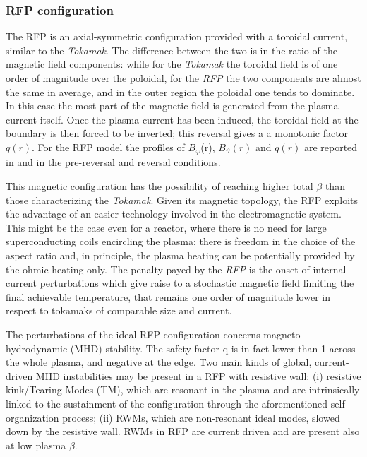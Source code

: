 \subsubsection{RFP configuration}
The \ac{RFP} is an axial-symmetric configuration provided with a toroidal current, similar to the \textit{Tokamak}. The difference between the two is in the ratio of the magnetic field components: while for the \textit{Tokamak} the toroidal field is of one order of magnitude over the poloidal, for the \textit{RFP} the two components are almost the same in average, and in the outer region the poloidal one tends to dominate. In this case the most part of the magnetic field is generated from the plasma current itself.
Once the plasma current has been induced, the toroidal field at the boundary is then forced to be inverted; this reversal gives a  a monotonic factor $q(r)$. For the \acs{RFP} model the profiles of $B_\varphi$(r), $B_\vartheta(r)$ and $q(r)$ are reported in \Figure{\ref{fig:intro_safety_factor_profiles_b}} and \Figure{\ref{fig:intro_safety_factor_profiles_c}} in the pre-reversal and reversal conditions.

This magnetic configuration has the possibility of reaching higher total $\beta$ than those characterizing the \textit{Tokamak}. 
Given its magnetic topology, the RFP exploits the advantage of an easier technology involved in the electromagnetic system. This might be the case even for a reactor, where there is no need for large superconducting coils encircling the plasma; there is freedom in the choice of the aspect ratio and, in principle, the plasma heating can be potentially provided by the ohmic heating only.  
The penalty payed by the \textit{RFP} is the onset of internal current perturbations  which give raise to a stochastic magnetic field limiting the final achievable temperature, that remains one order of magnitude lower in respect to tokamaks of comparable size and current.

The perturbations of the ideal RFP configuration concerns magneto-hydrodynamic (MHD) stability. The safety factor q is in fact lower than 1 across the whole plasma, and negative at the edge. 
Two main kinds of global, current-driven MHD instabilities may be present in a RFP with resistive wall: (i) resistive kink/Tearing Modes (TM), which are resonant in the plasma and are intrinsically linked to the sustainment of the configuration through the aforementioned self-organization process; (ii) RWMs, which are non-resonant ideal modes, slowed down by the resistive wall. RWMs in RFP are current driven and are present also at low plasma $\beta$.


